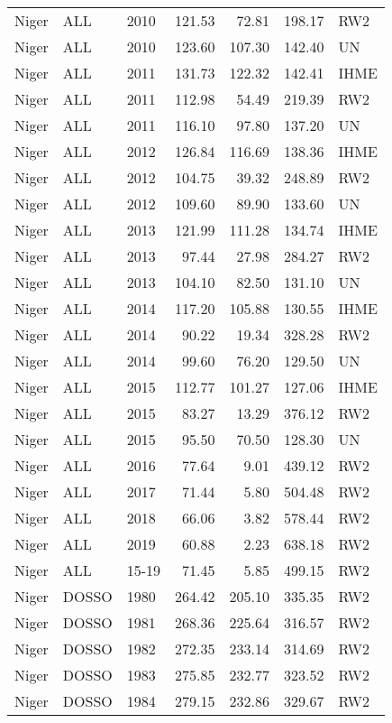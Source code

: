 \begin{longtable}{lllrrrl}
  Niger & ALL & 2010 & 121.53 & 72.81 & 198.17 & RW2 \\ 
  Niger & ALL & 2010 & 123.60 & 107.30 & 142.40 & UN \\ 
  Niger & ALL & 2011 & 131.73 & 122.32 & 142.41 & IHME \\ 
  Niger & ALL & 2011 & 112.98 & 54.49 & 219.39 & RW2 \\ 
  Niger & ALL & 2011 & 116.10 & 97.80 & 137.20 & UN \\ 
  Niger & ALL & 2012 & 126.84 & 116.69 & 138.36 & IHME \\ 
  Niger & ALL & 2012 & 104.75 & 39.32 & 248.89 & RW2 \\ 
  Niger & ALL & 2012 & 109.60 & 89.90 & 133.60 & UN \\ 
  Niger & ALL & 2013 & 121.99 & 111.28 & 134.74 & IHME \\ 
  Niger & ALL & 2013 & 97.44 & 27.98 & 284.27 & RW2 \\ 
  Niger & ALL & 2013 & 104.10 & 82.50 & 131.10 & UN \\ 
  Niger & ALL & 2014 & 117.20 & 105.88 & 130.55 & IHME \\ 
  Niger & ALL & 2014 & 90.22 & 19.34 & 328.28 & RW2 \\ 
  Niger & ALL & 2014 & 99.60 & 76.20 & 129.50 & UN \\ 
  Niger & ALL & 2015 & 112.77 & 101.27 & 127.06 & IHME \\ 
  Niger & ALL & 2015 & 83.27 & 13.29 & 376.12 & RW2 \\ 
  Niger & ALL & 2015 & 95.50 & 70.50 & 128.30 & UN \\ 
  Niger & ALL & 2016 & 77.64 & 9.01 & 439.12 & RW2 \\ 
  Niger & ALL & 2017 & 71.44 & 5.80 & 504.48 & RW2 \\ 
  Niger & ALL & 2018 & 66.06 & 3.82 & 578.44 & RW2 \\ 
  Niger & ALL & 2019 & 60.88 & 2.23 & 638.18 & RW2 \\ 
  Niger & ALL & 15-19 & 71.45 & 5.85 & 499.15 & RW2 \\ 
  Niger & DOSSO & 1980 & 264.42 & 205.10 & 335.35 & RW2 \\ 
  Niger & DOSSO & 1981 & 268.36 & 225.64 & 316.57 & RW2 \\ 
  Niger & DOSSO & 1982 & 272.35 & 233.14 & 314.69 & RW2 \\ 
  Niger & DOSSO & 1983 & 275.85 & 232.77 & 323.52 & RW2 \\ 
  Niger & DOSSO & 1984 & 279.15 & 232.86 & 329.67 & RW2 \\ 

\end{longtable}
